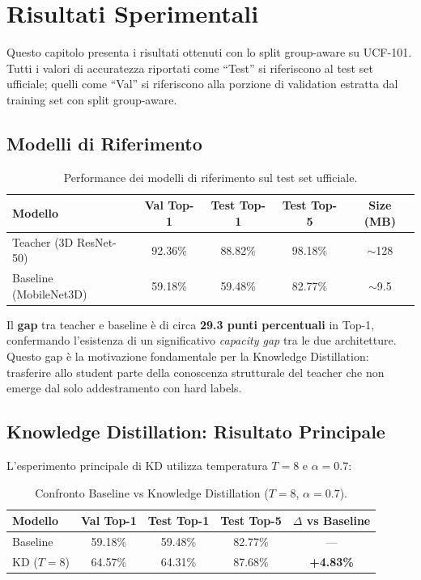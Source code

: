 \chapter{Risultati Sperimentali}
\label{chap:risultati}

Questo capitolo presenta i risultati ottenuti con lo split group-aware su UCF-101. Tutti i valori di accuratezza riportati come ``Test'' si riferiscono al test set ufficiale; quelli come ``Val'' si riferiscono alla porzione di validation estratta dal training set con split group-aware.

\section{Modelli di Riferimento}

\begin{table}[H]
\centering
\caption{Performance dei modelli di riferimento sul test set ufficiale.}
\label{tab:baselines}
\begin{tabular}{lcccc}
\toprule
\textbf{Modello} & \textbf{Val Top-1} & \textbf{Test Top-1} & \textbf{Test Top-5} & \textbf{Size (MB)} \\
\midrule
Teacher (3D ResNet-50) & 92.36\% & 88.82\% & 98.18\% & $\sim$128 \\
Baseline (MobileNet3D)  & 59.18\% & 59.48\% & 82.77\% & $\sim$9.5 \\
\bottomrule
\end{tabular}
\end{table}

Il \textbf{gap} tra teacher e baseline è di circa \textbf{29.3 punti percentuali} in Top-1, confermando l'esistenza di un significativo \textit{capacity gap} tra le due architetture. Questo gap è la motivazione fondamentale per la Knowledge Distillation: trasferire allo student parte della conoscenza strutturale del teacher che non emerge dal solo addestramento con hard labels.

\section{Knowledge Distillation: Risultato Principale}

L'esperimento principale di KD utilizza temperatura $T = 8$ e $\alpha = 0.7$:

\begin{table}[H]
\centering
\caption{Confronto Baseline vs Knowledge Distillation ($T=8$, $\alpha=0.7$).}
\label{tab:kd_main}
\begin{tabular}{lcccc}
\toprule
\textbf{Modello} & \textbf{Val Top-1} & \textbf{Test Top-1} & \textbf{Test Top-5} & \textbf{$\Delta$ vs Baseline} \\
\midrule
Baseline            & 59.18\% & 59.48\% & 82.77\% & --- \\
KD ($T=8$)          & 64.57\% & 64.31\% & 87.68\% & \textbf{+4.83\%} \\
\bottomrule
\end{tabular}
\end{table}

